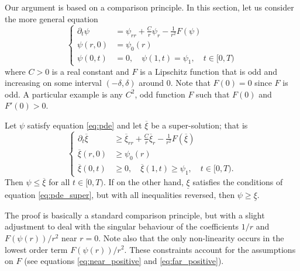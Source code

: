 \documentclass{amsart}
\begin{document}
Our argument is based on a comparison principle. In this section, let us consider the more general equation
\begin{equation}
\label{eq:pde}
\begin{cases}
\partial_t \psi &= \psi_{rr} + \frac{C}{r} \psi_r - \frac{1}{r^2} F(\psi) \\
\psi(r, 0) &= \psi_0(r) \\
\psi(0, t) &= 0, \quad \psi(1, t) = \psi_1, \quad t \in [0, T)
\end{cases}
\end{equation}
where \(C > 0\) is a real constant and \(F\) is a Lipschitz function that is odd and increasing on some interval \((-\delta, \delta)\) around \(0\). Note that \(F(0) = 0\) since \(F\) is odd. A particular example is any \(C^2\), odd function \(F\) such that \(F(0)\) and \(F'(0) > 0\).

\begin{thm}
Let \(\psi\) satisfy equation \eqref{eq:pde} and let \(\overline{\xi}\) be a super-solution; that is
\begin{equation}
\label{eq:pde_super}
\begin{cases}
\partial_t \overline{\xi} &\geq \overline{\xi}_{rr} + \frac{C}{r} \overline{\xi}_r - \frac{1}{r^2} F(\overline{\xi}) \\
\overline{\xi}(r, 0) &\geq \psi_0(r) \\
\overline{\xi}(0, t) &\geq 0, \quad \overline{\xi}(1, t) \geq \psi_1, \quad t \in [0, T).
\end{cases}
\end{equation}
Then \(\psi \leq \overline{\xi}\) for all \(t \in [0, T)\). If on the other hand, \(\underline{\xi}\) satisfies the conditions of equation \eqref{eq:pde_super}, but with all inequalities reversed, then \(\psi \geq \underline{\xi}\).
\end{thm}

The proof is basically a standard comparison principle, but with a slight adjustment to deal with the singular behaviour of the coefficients \(1/r\) and \(F(\psi(r))/r^2\) near \(r=0\). Note also that the only non-linearity occurs in the lowest order term \(F(\psi(r))/r^2\). These constraints account for the assumptions on \(F\) (see equations \eqref{eq:near_positive} and \eqref{eq:far_positive}).
\end{document}
